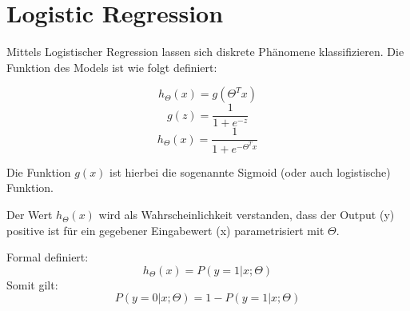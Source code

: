 \newpage
\section{Logistic Regression}
\begin{flushleft}


Mittels Logistischer Regression lassen sich diskrete Phänomene klassifizieren. Die Funktion des Models ist wie folgt definiert:


$$ h_{\Theta}(x) = g(\Theta^{T}x) $$ 
$$ g(z) = \frac{1}{1 + e^{-z}} $$
$$ h_{\Theta}(x) = \frac{1}{1 + e^{-\Theta^{T}x}} $$

Die Funktion $g(x)$ ist hierbei die sogenannte Sigmoid (oder auch logistische) Funktion.


Der Wert $h_{\Theta}(x)$ wird als Wahrscheinlichkeit verstanden, dass der Output (y) positive ist für ein gegebener Eingabewert (x) parametrisiert mit $\Theta$.
\linebreak

Formal definiert:
$$h_{\Theta}(x) = P(y=1|x;\Theta)$$
Somit gilt:
$$ P(y=0|x;\Theta) = 1 - P(y=1|x;\Theta)$$


\end{flushleft}



